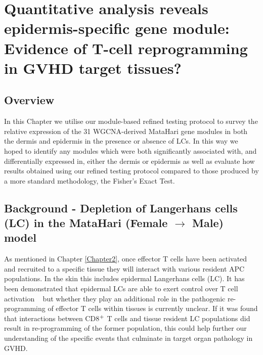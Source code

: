 
\chapter{Quantitative analysis reveals epidermis-specific gene module: Evidence of T-cell reprogramming in GVHD target tissues?} %

\label{Chapter5} %


\section{Overview}

In this Chapter we utilise our module-based refined testing protocol to survey the relative expression of the 31 WGCNA-derived MataHari gene modules in both the dermis and epidermis in the presence or absence of LCs. In this way we hoped to identify any modules which were both significantly associated with, and differentially expressed in, either the dermis or epidermis as well as evaluate how results obtained using our refined testing protocol compared to those produced by a more standard methodology, the Fisher's Exact Test. 

\section{Background - Depletion of Langerhans cells (LC) in the MataHari (Female $\to$ Male) model}

As mentioned in Chapter \ref{Chapter2}, once effector T cells have been activated and recruited to a specific tissue they will interact with various resident APC populations. In the skin this includes epidermal Langerhans cells (LC). It has been demonstrated that epidermal LCs are able to exert control over T cell activation ~\autocite{Igy2013} but whether they play an additional role in the pathogenic re-programming of effector T cells within tissues is currently unclear. If it was found that interactions between CD8$\textsuperscript{+}$ T cells and tissue resident LC populations did result in re-programming of the former population, this could help further our understanding of the specific events that culminate in target organ pathology in GVHD. 

